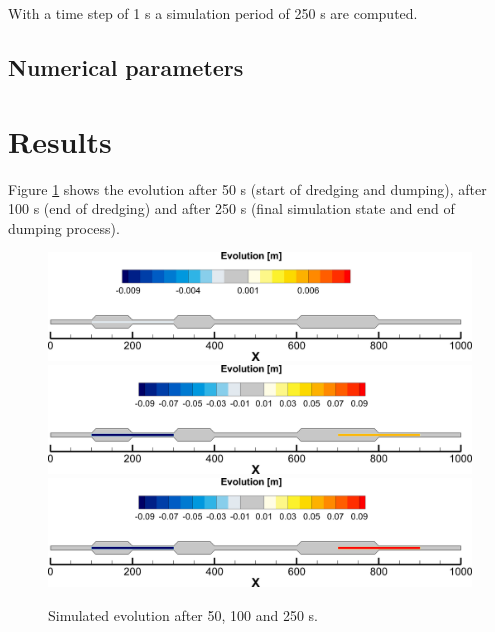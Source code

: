 With a time step of 1 s a simulation period of 250 s are computed.
%
%
\subsection{Numerical parameters}
%
%
%
\section{Results}
%
Figure \ref{result50} shows the evolution after 50 s (start of dredging and dumping),
after 100 s (end of dredging) and after 250 s (final simulation state and end of dumping process).

\begin{figure} [!h]
\centering
\includegraphics[scale=0.15]{../img/result50.png}
\includegraphics[scale=0.15]{../img/result150.png}
\includegraphics[scale=0.15]{../img/result250.png}
 \caption{Simulated evolution after 50, 100 and 250 s.}\label{result50}
\end{figure}


